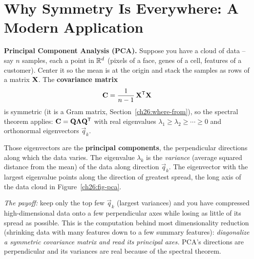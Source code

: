 \section{Why Symmetry Is Everywhere: A Modern Application}
\label{ch26:application}

\begin{applicationbox}
\textbf{Principal Component Analysis (PCA).} Suppose you have a cloud of data --
say $n$ samples, each a point in $\mathbb{R}^d$ (pixels of a face, genes of a cell,
features of a customer). Center it so the mean is at the origin and stack the
samples as rows of a matrix $\mathbf{X}$. The \textbf{covariance matrix}
\[
  \mathbf{C} = \frac{1}{n-1}\,\mathbf{X}^{\mathsf{T}}\mathbf{X}
\]
is symmetric (it is a Gram matrix, Section~\ref{ch26:where-from}), so the spectral
theorem applies: $\mathbf{C} = \mathbf{Q}\mathbf{\Lambda}\mathbf{Q}^{\mathsf{T}}$ with real eigenvalues
$\lambda_1 \ge \lambda_2 \ge \cdots \ge 0$ and orthonormal eigenvectors
$\vec{q}_k$.

Those eigenvectors are the \textbf{principal components}, the perpendicular
directions along which the data varies. The eigenvalue $\lambda_k$ is the
\emph{variance} (average squared distance from the mean) of the data along
direction $\vec{q}_k$. The eigenvector with the largest eigenvalue points along
the direction of greatest spread, the long axis of the data cloud in
Figure~\ref{ch26:fig-pca}.

\emph{The payoff:} keep only the top few $\vec{q}_k$ (largest variances) and you
have compressed high-dimensional data onto a few perpendicular axes while losing
as little of its spread as possible. This is the computation behind most
dimensionality reduction (shrinking data with many features down to a few
summary features): \emph{diagonalize a symmetric covariance matrix and read
its principal axes.} PCA's directions are perpendicular and its variances are
real because of the spectral theorem.
\end{applicationbox}

